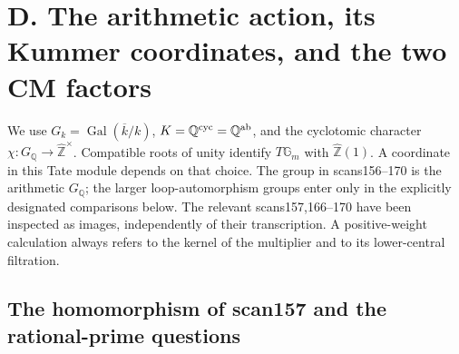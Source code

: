 \section{D. The arithmetic action, its Kummer coordinates, and the two CM factors}
\label{sec:D}

We use $G_k=\operatorname{Gal}(\overline k/k)$, $K=\mathbb Q^{\rm cyc}=\mathbb Q^{\rm ab}$, and the cyclotomic character $\chi:G_{\mathbb Q}\to\widehat{\mathbb Z}^{\times}$. Compatible roots of unity identify $T\mathbb G_m$ with $\widehat{\mathbb Z}(1)$. A coordinate in this Tate module depends on that choice. The group in scans156--170 is the arithmetic $G_{\mathbb Q}$; the larger loop-automorphism groups enter only in the explicitly designated comparisons below. The relevant scans157,166--170 have been inspected as images, independently of their transcription. A positive-weight calculation always refers to the kernel of the multiplier and to its lower-central filtration.

\subsection{The homomorphism of scan157 and the rational-prime questions}

